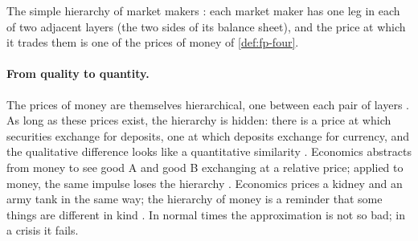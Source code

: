 \begin{paracol}{2}
\begin{nfigure}
\caption{The simple hierarchy of market makers : each market maker has one leg in each of two adjacent
layers (the two sides of its balance sheet), and the price at which it trades them is one of the prices of money of
\cref{def:fp-four}.}\label{fig:nh-marketmakers}
\end{nfigure}

\paragraph{From quality to quantity.} The prices of money are themselves hierarchical, one between each pair of layers
. As long as these prices exist, the hierarchy is hidden: there is a price at which securities exchange for
deposits, one at which deposits exchange for currency, and the qualitative difference looks like a quantitative
similarity . Economics abstracts from money to see good A and good B exchanging at a relative
price; applied to money, the same impulse loses the hierarchy . Economics prices a kidney and
an army tank in the same way; the hierarchy of money is a reminder that some things are different in kind
. In normal times the approximation is not so bad; in a crisis it fails.


\end{paracol}

